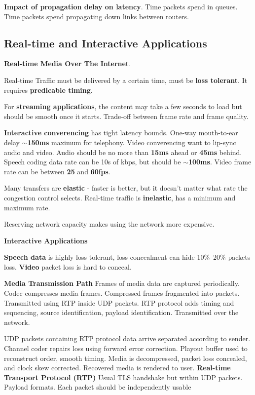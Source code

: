 \documentclass{article}
\begin{document}
\vspace{\baselineskip}
\textbf{Impact of propagation delay on latency}.
Time packets spend in queues.
Time packets spend propagating down links between routers.

\clearpage

\subsection*{Real-time and Interactive Applications}

\textbf{Real-time Media Over The Internet}.

Real-time Traffic must be delivered by a certain time, must be \textbf{loss tolerant}.
It requires \textbf{predicable timing}.

For \textbf{streaming applications}, the content may take a few seconds to load but should be smooth once it starts.
Trade-off between frame rate and frame quality.

\textbf{Interactive converencing} has tight latency bounds.
One-way mouth-to-ear delay \textbf{$\sim$150ms} maximum for telephony.
Video converencing want to lip-sync audio and video.
Audio should be no more than \textbf{15ms} ahead or \textbf{45ms} behind.
Speech coding data rate can be 10s of kbps, but should be \textbf{$\sim$100ms}.
Video frame rate can be between \textbf{25} and \textbf{60fps}.

Many transfers are \textbf{elastic} {-} faster is better, but it doesn't matter what rate the congestion control selects.
Real-time traffic is \textbf{inelastic}, has a minimum and maximum rate.

Reserving network capacity makes using the network more expensive.

\vspace{\baselineskip}
\textbf{Interactive Applications}

\textbf{Speech data} is highly loss tolerant, loss concealment can hide 10\%--20\% packets loss.
\textbf{Video} packet loss is hard to conceal.

\textbf{Media Transmission Path}
Frames of media data are captured periodically.
Codec compresses media frames.
Compressed frames fragmented into packets.
Transmitted using RTP inside UDP packets.
RTP protocol adds timing and sequencing, source identification, payload identification.
Transmitted over the network.

UDP packets containing RTP protocol data arrive separated according to sender.
Channel coder repairs loss using forward error correction.
Playout buffer used to reconstruct order, smooth timing.
Media is decompressed, packet loss concealed, and clock skew corrected.
Recovered media is rendered to user.
\textbf{Real-time Transport Protocol (RTP)}
Usual TLS handshake but within UDP packets.
Payload formats.
Each packet should be independently usable
\end{document}
